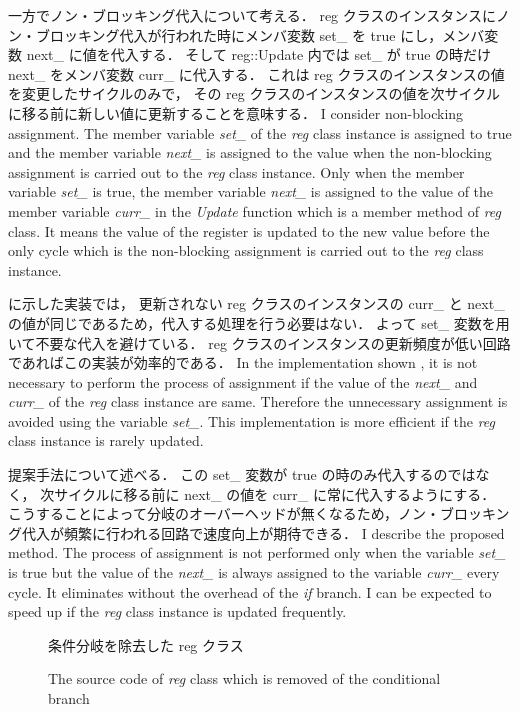 一方でノン・ブロッキング代入について考える．
reg クラスのインスタンスにノン・ブロッキング代入が行われた時にメンバ変数 set\_ を true にし，メンバ変数 next\_ に値を代入する．
そして reg::Update 内では set\_ が true の時だけ next\_ をメンバ変数 curr\_ に代入する．
これは reg クラスのインスタンスの値を変更したサイクルのみで，
その reg クラスのインスタンスの値を次サイクルに移る前に新しい値に更新することを意味する．
\fi
I consider non-blocking assignment.
The member variable \textit{set\_} of the \textit{reg} class instance is assigned to true
and the member variable \textit{next\_} is assigned to the value
when the non-blocking assignment is carried out to the \textit{reg} class instance.
Only when the member variable \textit{set\_} is true, the member variable \textit{next\_} is assigned to the value of the member variable \textit{curr\_} in the \textit{Update} function which is a member method of \textit{reg} class.
It means the value of the register is updated to the new value before the only cycle which is the non-blocking assignment is carried out to the \textit{reg} class instance.

 に示した実装では，
更新されない reg クラスのインスタンスの curr\_ と next\_ の値が同じであるため，代入する処理を行う必要はない．
よって set\_ 変数を用いて不要な代入を避けている．
reg クラスのインスタンスの更新頻度が低い回路であればこの実装が効率的である．
\fi
In the implementation shown ,
it is not necessary to perform the process of assignment
if the value of the \textit{next\_} and \textit{curr\_} of the \textit{reg} class instance are same.
Therefore the unnecessary assignment is avoided using the variable \textit{set\_}.
This implementation is more efficient if the \textit{reg} class instance is rarely updated.

提案手法について述べる．
この set\_ 変数が true の時のみ代入するのではなく，
次サイクルに移る前に next\_ の値を curr\_ に常に代入するようにする．
こうすることによって分岐のオーバーヘッドが無くなるため，ノン・ブロッキング代入が頻繁に行われる回路で速度向上が期待できる．
\fi
I describe the proposed method.
The process of assignment is not performed only when the variable \textit{set\_} is true
but the value of the \textit{next\_} is always assigned to the variable \textit{curr\_} every cycle.
It eliminates without the overhead of the \textit{if} branch.
I can be expected to speed up if the \textit{reg} class instance is updated frequently.


\begin{figure}[tb]
 
 \caption{条件分岐を除去した reg クラス}
\fi
 \caption{The source code of \textit{reg} class which is removed of the conditional branch}
 \label{src:reg_no_set}
\end{figure}

